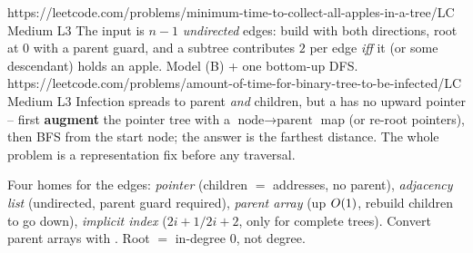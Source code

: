 \begin{practiceset}
    {https://leetcode.com/problems/minimum-time-to-collect-all-apples-in-a-tree/}{LC Medium L3}
    {The input is $n{-}1$ \emph{undirected} edges: build  with both directions,
    root at $0$ with a parent guard, and a subtree contributes $2$ per edge \emph{iff} it
    (or some descendant) holds an apple. Model (B) + one bottom-up DFS.}
    {https://leetcode.com/problems/amount-of-time-for-binary-tree-to-be-infected/}{LC Medium L3}
    {Infection spreads to parent \emph{and} children, but a  has no upward
    pointer -- first \textbf{augment} the pointer tree with a $\text{node}\to\text{parent}$
    map (or re-root pointers), then BFS from the start node; the answer is the farthest
    distance. The whole problem is a representation fix before any traversal.}
\end{practiceset}

\begin{recallbox}
Four homes for the edges: \emph{pointer} (children $=$ addresses, no parent), \emph{adjacency
list} (undirected, parent guard required), \emph{parent array} (up $O(1)$, rebuild
children to go down), \emph{implicit index} ($2i{+}1/2i{+}2$, only for complete trees).
Convert parent arrays with . Root $=$ in-degree $0$, not
degree.
\end{recallbox}

